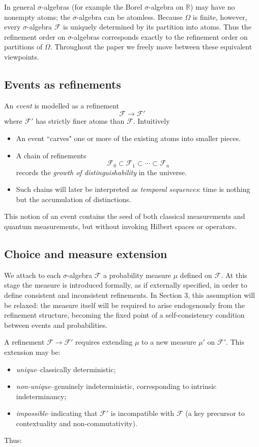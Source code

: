 \documentclass[
 amsmath,amssymb,
  onecolumn %
]{revtex4-2}
\newcommand{\Ff}{{\mathcal F}}  %
\begin{document}
In general $\sigma$-algebras (for example the Borel $\sigma$-algebra on $\mathbb{R}$) may have no nonempty atoms; the $\sigma$-algebra can be atomless.
Because $\Omega$ is finite, however, every $\sigma$-algebra $\mathcal F$
is uniquely determined by its partition into atoms.
Thus the refinement order on $\sigma$-algebras corresponds exactly to the
refinement order on partitions of $\Omega$.
Throughout the paper we freely move between these equivalent viewpoints.
\subsection{Events as refinements} 
An \emph{event} is modelled as a refinement
$$
\Ff \longrightarrow \Ff'
$$
where $\Ff'$ has strictly finer atoms than $\Ff$. Intuitively

\begin{itemize}[leftmargin=2em]
\item An event ``carves" one or more of the existing atoms into smaller pieces.
\item A chain of refinements
$$
\Ff_0 \subset \Ff_1 \subset \cdots \subset \Ff_n
$$
records the \emph{growth of distinguishability} in the universe.
\item Such chains will later be interpreted as \emph{temporal sequences}: time is nothing but the accumulation of distinctions.
\end{itemize}

This notion of an event contains the seed of both classical measurements and quantum measurements, but without invoking Hilbert spaces or operators.

\subsection{Choice and measure extension} 
We attach to each $\sigma$-algebra $\Ff$ a probability measure $\mu$ defined on $\Ff$. At this stage the measure is introduced formally, as if externally specified, in order to define consistent and inconsistent refinements. In Section 3, this assumption will be relaxed: the measure itself will be required to arise endogenously from the refinement structure, becoming the fixed point of a self-consistency condition between events and probabilities.


A refinement $\Ff \longrightarrow \Ff'$ requires extending $\mu$ to a new measure $\mu'$ on $\Ff'$. This extension may be:
\begin{itemize}[leftmargin=2em]
\item \emph{unique}--classically deterministic;
\item \emph{non-unique}--genuinely indeterministic, corresponding to intrinsic indeterminancy;
\item \emph{impossible}--indicating that $\Ff'$ is incompatible with $\Ff$ (a key precursor to contextuality and non-commutativity). 
\end{itemize}
Thus:
\end{document}
